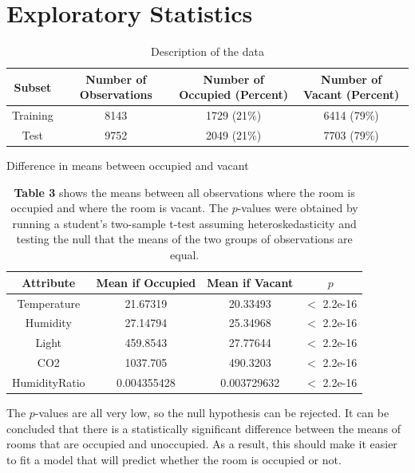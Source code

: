 \documentclass{article}
\begin{document}
\section{Exploratory Statistics}
\begin{table}[H]
	\centering
	\caption{Description of the data}
		\begin{tabular}{c|c|c|c}
		Subset & Number of Observations & Number of Occupied (Percent) & Number of Vacant (Percent) \\
		\hline\hline
		Training & 8143 & 1729 (21\%) & 6414 (79\%) \\
		\hline
		Test	 & 9752 & 2049 (21\%) & 7703 (79\%) \\
		\end{tabular}
\end{table}

\begin{table}[H]
	\centering
	\caption{Difference in means between occupied and vacant}
	\begin{tabular}{c|c|c|c}
	Attribute & Mean if Occupied & Mean if Vacant & $p$\\
	\hline\hline
	Temperature & 21.67319 & 20.33493 & $<$ 2.2e-16\\
\hline
Humidity    &   27.14794 & 25.34968 & $<$ 2.2e-16 \\
\hline
Light      &    459.8543& 27.77644 & $<$ 2.2e-16\\
\hline
CO2          &  1037.705 &490.3203& $<$ 2.2e-16\\
\hline
HumidityRatio & 0.004355428 &0.003729632 & $<$ 2.2e-16\\
	\end{tabular}
	\caption*{\textbf{Table 3} shows the means between all observations where the room is occupied and where the room is vacant. The $p$-values were obtained by running a student's two-sample t-test assuming heteroskedasticity and testing the null that the means of the two groups of observations are equal. }
\end{table}

\noindent The $p$-values are all very low, so the null hypothesis can be rejected. It can be concluded that there is a statistically significant difference between the means of rooms that are occupied and unoccupied. As a result, this should make it easier to fit a model that will predict whether the room is occupied or not.
\end{document}
